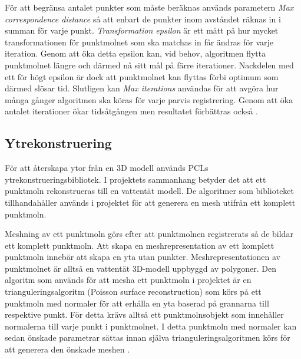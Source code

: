 För att begränsa antalet punkter som måste beräknas används parametern \textit{Max correspondence distance} så att enbart de punkter inom avståndet räknas in i summan för varje punkt. \textit{Transformation epsilon} är ett mått på hur mycket transformationen för punktmolnet som ska matchas in får ändras för varje iteration. Genom att öka detta epsilon kan, vid behov, algoritmen flytta punktmolnet längre och därmed nå sitt mål på färre iterationer. Nackdelen med ett för högt epsilon är dock att punktmolnet kan flyttas förbi optimum som därmed slösar tid. Slutligen kan \textit{Max iterations} användas för att avgöra hur många gånger algoritmen ska köras för varje parvis registrering. Genom att öka antalet iterationer ökar tidsåtgången men resultatet förbättras också \cite{pcl_icp_docs}.

\subsection{Ytrekonstruering}
 För att återskapa ytor från en 3D modell används PCLs ytrekonstrueringsbibliotek. I projektets sammanhang betyder det att ett punktmoln rekonstrueras till en vattentät modell. De algoritmer som biblioteket tillhandahåller används i projektet för att generera en mesh utifrån ett komplett punktmoln\cite{pcl_surface_reconstruction}.  



Meshning av ett punktmoln görs efter att punktmolnen registrerats så de bildar ett komplett punktmoln. Att skapa en meshrepresentation av ett komplett punktmoln innebär att skapa en yta utan punkter. Meshrepresentationen av punktmolnet är alltså en vattentät 3D-modell uppbyggd av polygoner. Den algoritm som används för att mesha ett punktmoln i projektet är en trianguleringsalgoritm (Poisson surface reconstruction) som körs på ett punktmoln med normaler för att erhålla en yta baserad på grannarna till respektive punkt. För detta krävs alltså ett punktmolnsobjekt som innehåller normalerna till varje punkt i punktmolnet. I detta punktmoln med normaler kan sedan önskade parametrar sättas innan själva trianguleringsalgoritmen körs för att generera den önskade meshen \cite{pcl_surface_reconstruction}\cite{pcl_triangulation_algorithm}. 


